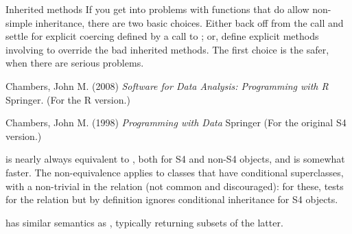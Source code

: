 \begin{Section}{Inherited methods}
If you get into problems with functions that do allow non-simple
inheritance, there are two basic choices.  Either
back off from the  call and settle for explicit coercing
defined by a call to ; or, define explicit
methods involving  to override the bad inherited
methods.  The first choice is the safer, when there are serious
problems.

\end{Section}
%
\begin{References}\relax
Chambers, John M. (2008)
\emph{Software for Data Analysis: Programming with R}
Springer.  (For the R version.)

Chambers, John M. (1998)
\emph{Programming with Data}
Springer (For the original S4 version.)
\end{References}
%
\begin{SeeAlso}\relax
{} is nearly always equivalent to
, both for S4 and non-S4 objects, and is somewhat faster.
The non-equivalence applies to classes that have conditional
superclasses, with a non-trivial  in the relation (not
common and discouraged):  for these,  tests for the
relation but  by definition ignores conditional
inheritance for S4 objects.


 has similar semantics as
, typically returning subsets of the latter.
\end{SeeAlso}
%

